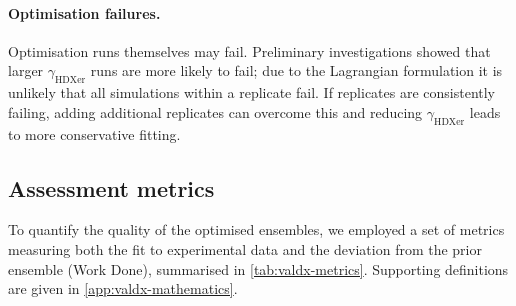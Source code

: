 \paragraph{Optimisation failures.}
Optimisation runs themselves may fail. Preliminary investigations showed that larger $\gamma_\text{HDXer}$ runs are more likely to fail; due to the Lagrangian formulation it is unlikely that all simulations within a replicate fail. If replicates are consistently failing, adding additional replicates can overcome this and reducing $\gamma_\text{HDXer}$ leads to more conservative fitting.

\subsection{Assessment metrics}
\label{sec:valdx-work}

To quantify the quality of the optimised ensembles, we employed a set of metrics measuring both the fit to experimental data and the deviation from the prior ensemble (Work Done), summarised in \cref{tab:valdx-metrics}. Supporting definitions are given in \cref{app:valdx-mathematics}.

